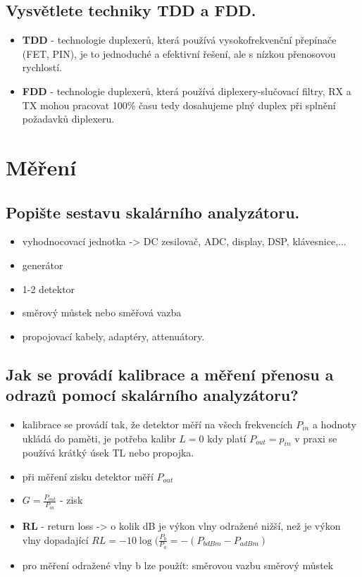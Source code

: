 \documentclass[a4paper]{article}
\begin{document}
\subsection{\textbf{Vysvětlete techniky TDD a FDD.}}
\begin{itemize}
	\item \textbf{TDD} - technologie duplexerů, která používá vysokofrekvenční přepínače (FET, PIN), je to jednoduché a efektivní řešení, ale s nízkou přenosovou rychlostí.
	\item \textbf{FDD} - technologie duplexerů, která používá diplexery-slučovací filtry, RX a TX mohou pracovat 100\% času tedy dosahujeme plný duplex při splnění požadavků diplexeru.
\end{itemize}

\section{Měření}
\subsection{\textbf{Popište sestavu skalárního analyzátoru.}}
\begin{itemize}
	\item vyhodnocovací jednotka -> DC zesilovač, ADC, display, DSP, klávesnice,...
	\item generátor
	\item 1-2 detektor
	\item směrový můstek nebo směřová vazba
	\item propojovací kabely, adaptéry, attenuátory.
\end{itemize}
\subsection{\textbf{Jak se provádí kalibrace a měření přenosu a odrazů pomocí skalárního analyzátoru? }}
\begin{itemize}
	\item kalibrace se provádí tak, že detektor měří na všech frekvencích $P_{in}$ a hodnoty ukládá do paměti, je potřeba kalibr $L=0$ kdy platí $P_{out}=p_{in}$ v praxi se používá krátký úsek TL nebo propojka.
	\item při měření zisku detektor měří $P_{out}$
	\item $G=\frac{P_{out}}{P_{in}}$ - zisk
	\item \textbf{RL} - return loss -> o kolik dB je výkon vlny odražené nižší, než je výkon vlny dopadající $RL = -10\log(\frac{P_b}{P_a}=-(P_{bdBm}-P_{adBm})$
	\item pro měření odražené vlny b lze použít:
	\subitem směrovou vazbu
	\subitem směrový můstek
\end{itemize}
\end{document}

